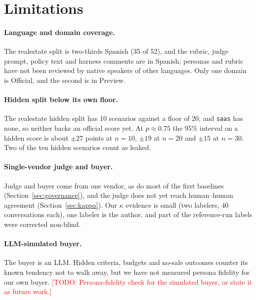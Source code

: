 \documentclass[11pt]{article}
\newcommand{\TODO}[1]{\textcolor{red}{[TODO: #1]}}
\newcommand{\code}[1]{\texttt{#1}}
\begin{document}
\section{Limitations}
\label{sec:limitations}

\paragraph{Language and domain coverage.} The realestate split is two-thirds Spanish (35 of 52), and
the rubric, judge prompt, policy text and harness comments are in Spanish; personas and rubric have not
been reviewed by native speakers of other languages. Only one domain is Official, and the second is in
Preview.

\paragraph{Hidden split below its own floor.} The realestate hidden split has 10 scenarios against a
floor of 20, and \code{saas} has none, so neither backs an official score yet. At $p\approx0.75$ the 95\%
interval on a hidden score is about $\pm27$ points at $n{=}10$, $\pm19$ at $n{=}20$ and $\pm15$ at
$n{=}30$.
Two of the ten hidden scenarios count as leaked.

\paragraph{Single-vendor judge and buyer.} Judge and buyer come from one vendor, as do most of the
first baselines (Section~\ref{sec:governance}), and the judge does not yet reach human--human agreement
(Section~\ref{sec:kappa}). Our $\kappa$ evidence is small (two labelers, 40 conversations each), one labeler is
the author, and part of the reference-run labels were corrected non-blind.

\paragraph{LLM-simulated buyer.} The buyer is an LLM. Hidden criteria, budgets and no-sale outcomes
counter its known tendency not to walk away, but we have not measured persona fidelity for our own buyer.
\TODO{Persona-fidelity check for the simulated buyer, or state it as future work.}
\end{document}
